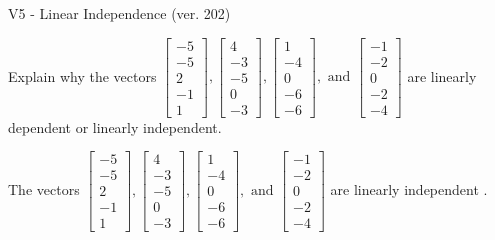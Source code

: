 \begin{exercise}
  \begin{exerciseTitle}V5 - Linear Independence (ver. 202)\end{exerciseTitle}
  \begin{exerciseStatement}
    Explain why the vectors \(\left[\begin{array}{r}
-5 \\
-5 \\
2 \\
-1 \\
1
\end{array}\right] , \left[\begin{array}{r}
4 \\
-3 \\
-5 \\
0 \\
-3
\end{array}\right] , \left[\begin{array}{r}
1 \\
-4 \\
0 \\
-6 \\
-6
\end{array}\right] , \text{ and } \left[\begin{array}{r}
-1 \\
-2 \\
0 \\
-2 \\
-4
\end{array}\right]\) are linearly dependent or linearly independent.	


  \end{exerciseStatement}
  \begin{exerciseAnswer}
   The vectors \(\left[\begin{array}{r}
-5 \\
-5 \\
2 \\
-1 \\
1
\end{array}\right] , \left[\begin{array}{r}
4 \\
-3 \\
-5 \\
0 \\
-3
\end{array}\right] , \left[\begin{array}{r}
1 \\
-4 \\
0 \\
-6 \\
-6
\end{array}\right] , \text{ and } \left[\begin{array}{r}
-1 \\
-2 \\
0 \\
-2 \\
-4
\end{array}\right]\) are 
  	 linearly independent  .
  


  \end{exerciseAnswer}
\end{exercise}
